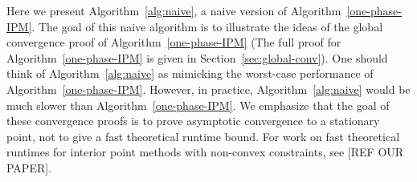 \documentclass{article}
\begin{document}
Here we present Algorithm~\ref{alg:naive}, a naive version of Algorithm~\ref{one-phase-IPM}. The goal of this naive algorithm is to illustrate the ideas of the global convergence proof of Algorithm~\ref{one-phase-IPM} (The full proof for Algorithm~\ref{one-phase-IPM} is given in Section~\ref{sec:global-conv}). One should think of Algorithm~\ref{alg:naive} as mimicking the worst-case performance of Algorithm~\ref{one-phase-IPM}. However, in practice, Algorithm~\ref{alg:naive} would be much slower than  Algorithm~\ref{one-phase-IPM}. We emphasize that the goal of these convergence proofs is to prove asymptotic convergence to a stationary point, not to give a fast theoretical runtime bound. For work on fast theoretical runtimes for interior point methods with non-convex constraints, see [REF OUR PAPER]. 
\end{document}
